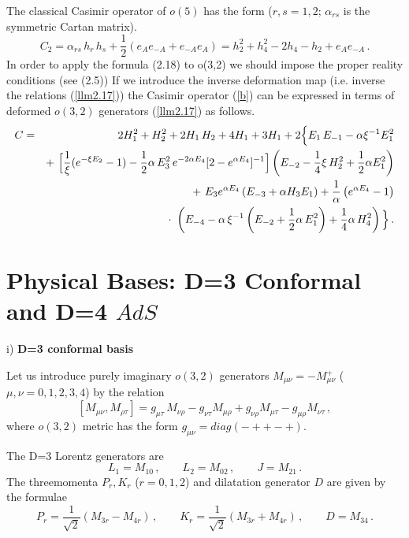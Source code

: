 \documentclass[a4paper,12pt,showkeys]{article}
\begin{document}
The classical Casimir operator of $o(5)$
has the form
($r,s=1,2; \, \alpha_{rs}$ is the symmetric Cartan matrix).
\begin{equation}\label{b}
  C_2 = \alpha_{rs} \, h_r \, h_s + \frac{1}{2} (e_A e_{-A} +
  e_{-A} e_{A} ) = h^2_2 + h^2_4 - 2h_4
  -h_2 + e_A e_{-A}  \, .
\end{equation}
In order to apply the formula (2.18) to o(3,2) we should impose
the proper reality conditions (see (2.5))
If we introduce the inverse deformation map
 (i.e. inverse the  relations (\ref{llm2.17}))
 the Casimir operator (\ref{b})
can be expressed in terms of deformed $o(3,2)$
 generators (\ref{llm2.17}) as follows.
\begin{eqnarray}\label{lulymo2.24}
C &  = & 2H^2_1 + H^2_2 + 2H_1\,H_2 + 4 H_1 + 3H_1 +
2 \Big\{ E_1\, E_{-1} - \alpha \xi^{-1} E^2_1
\cr
&& + \
\Big[ \frac{1}{\xi} (e^{-\xi E_2} - 1)
- \frac{1}{2} \alpha \, E^2_3 \,e^{-2\alpha E_4}
[2-e^{\alpha E_4} ]^{-1} \Big]
\left( E_{-2} - \frac{1}{4} \xi \,H^2_2 +
\frac{1}{2} \alpha E^2_1 \right)
\cr
&&+ \ E_3 e^{\alpha E_4} \left( E_{-3} + \alpha H_3 E_1\right) +
\frac{1}{\alpha} \left( e^{\alpha E_4} - 1\right)
\cr
&& \cdot \
\left( E_{-4}
  - \alpha \, \xi^{-1}
\left( E_{-2} + \frac{1}{2}  \alpha \,
E^{2}_1 \right) + \frac{1}{4} \alpha \, H^2_4 \right) \Big\}\, .
\end{eqnarray}




\section{Physical Bases:  D=3 Conformal and
 D=4 $AdS$}
\setcounter{equation}{0}

  i) {\bf D=3 conformal basis}

  Let us introduce purely imaginary $o(3,2)$ generators $M_{\mu\nu} = -
  M^{+}_{\mu\nu} $ ($\mu,\nu = 0,1,2,3,4$) by the relation
  \begin{equation}\label{llm22.9}
  [M_{\mu\nu} , M_{\rho \tau} ] = g_{\mu\tau} \,
  M_{\nu\rho} - g_{\nu\tau} M_{\mu\rho} + g_{\nu\rho}
  M_{\mu\tau} - g_{\mu\rho} M_{\nu\tau} \, ,
  \end{equation}
  where $o(3,2)$ metric has the form          $g_{\mu\nu} = diag
  (- + + - +)$.

  The D=3 Lorentz generators are
  \begin{equation}\label{llm22.10a}
  L_1 = M_{10} \, , \qquad
  L_2 = M_{02} \, , \qquad J=M_{21} \, .
\end{equation}
The threemomenta $P_r , K_r$ ($r=0,1,2$) and dilatation
 generator $D$
are given by the formulae
\begin{equation}\label{llm22.10b}
P_r = \frac{1}{\sqrt{2}} (M_{3r} - M_{4r} ) \, , \qquad K_r =
\frac{1}{\sqrt{2}} (M_{3r} + M_{4r} ) \, , \qquad D= M_{34} \, .
\end{equation}
\end{document}
